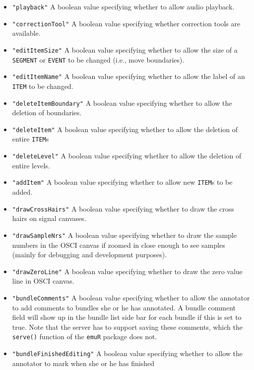 \documentclass[]{book}
\theoremstyle{definition}
\theoremstyle{definition}
\theoremstyle{definition}
\theoremstyle{remark}
\begin{document}
\begin{itemize}
\begin{itemize}
    \begin{itemize}
    \item
      \texttt{"playback"} A boolean value specifying whether to allow
      audio playback.
    \item
      \texttt{"correctionTool"} A boolean value specifying whether
      correction tools are available.
    \item
      \texttt{"editItemSize"} A boolean value specifying whether to
      allow the size of a \texttt{SEGMENT} or \texttt{EVENT} to be
      changed (i.e., move boundaries).
    \item
      \texttt{"editItemName"} A boolean value specifying whether to
      allow the label of an \texttt{ITEM} to be changed.
    \item
      \texttt{"deleteItemBoundary"} A boolean value specifying whether
      to allow the deletion of boundaries.
    \item
      \texttt{"deleteItem"} A boolean value specifying whether to allow
      the deletion of entire \texttt{ITEM}s
    \item
      \texttt{"deleteLevel"} A boolean value specifying whether to allow
      the deletion of entire levels.
    \item
      \texttt{"addItem"} A boolean value specifying whether to allow new
      \texttt{ITEM}s to be added.
    \item
      \texttt{"drawCrossHairs"} A boolean value specifying whether to
      draw the cross hairs on signal canvases.
    \item
      \texttt{"drawSampleNrs"} A boolean value specifying whether to
      draw the sample numbers in the OSCI canvas if zoomed in close
      enough to see samples (mainly for debugging and development
      purposes).
    \item
      \texttt{"drawZeroLine"} A boolean value specifying whether to draw
      the zero value line in OSCI canvas.
    \item
      \texttt{"bundleComments"} A boolean value specifying whether to
      allow the annotator to add comments to bundles she or he has
      annotated. A bundle comment field will show up in the bundle list
      side bar for each bundle if this is set to true. Note that the
      server has to support saving these comments, which the
      \texttt{serve()} function of the \texttt{emuR} package does not.
    \item
      \texttt{"bundleFinishedEditing"} A boolean value specifying
      whether to allow the annotator to mark when she or he has finished

\end{itemize}
\end{itemize}
\end{itemize}
\end{document}
